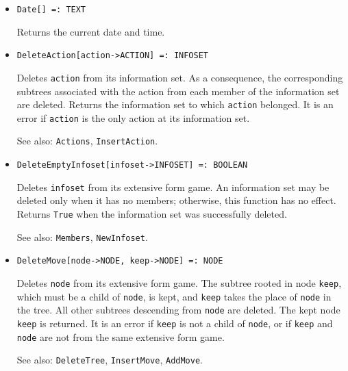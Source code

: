 \begin{itemize}

\item{}
\protect \large \begin{verbatim}
Date[] =: TEXT 
\end{verbatim}\normalsize

\bd
Returns the current date and time. 
\ed

\item{}
\protect \large \begin{verbatim}
DeleteAction[action->ACTION] =: INFOSET 
\end{verbatim}\normalsize

\bd
Deletes \verb+action+ from its information set. 
As a consequence, the corresponding subtrees associated
with the action from each member of the information set are deleted.
Returns the information set to which \verb+action+ belonged.  It is an
error if \verb+action+ is the only action at its information set.
\item [See also:] \verb+Actions+, \verb+InsertAction+.
\ed

\item{}
\protect \large \begin{verbatim}
DeleteEmptyInfoset[infoset->INFOSET] =: BOOLEAN 
\end{verbatim}\normalsize

\bd
Deletes \verb+infoset+ from its extensive form game.  An information set
may be deleted only when it has no members; otherwise, this function has
no effect.  Returns \verb+True+ when the information set was successfully
deleted.
\item [See also:] \verb+Members+, \verb+NewInfoset+.
\ed

\item{}
\protect \large \begin{verbatim}
DeleteMove[node->NODE, keep->NODE] =: NODE 
\end{verbatim}\normalsize

\bd
Deletes \verb+node+ from its extensive form game.  The
subtree rooted in node \verb+keep+, which must be a child of
\verb+node+, is kept, and \verb+keep+ takes the place of \verb+node+ in
the tree.  All other subtrees descending from \verb+node+ are deleted.
The kept node \verb+keep+ is returned.  It is an error if \verb+keep+
is not a child of \verb+node+, or if \verb+keep+ and \verb+node+ are not
from the same extensive form game.
\item [See also:] \verb+DeleteTree+, \verb+InsertMove+, \verb+AddMove+.
\ed


\end{itemize}
